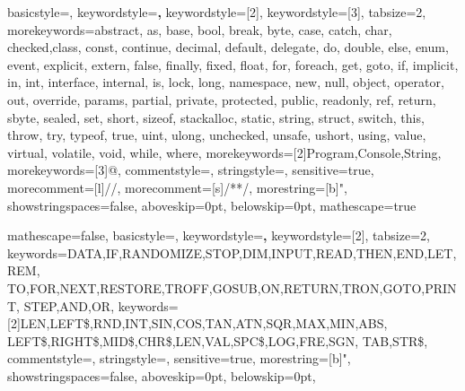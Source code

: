\usepackage{ulem}			%
\usepackage{listings}	%
\usepackage{ifthen}		%
\usepackage{graphicx}

\usepackage[spanish]{babel} %
\usepackage[latin1]{inputenc}



\newcommand{\CommentColor}{\color{green!60!black}}

\newcommand{\StringColor}{\color{red!70!black}}

\newcommand{\UserKeywordsColor}{\color{cyan!50!black}}

\newcommand{\KeywordsColor}{\color{blue}}

{
	basicstyle=\small\ttfamily,
	keywordstyle=\KeywordsColor\textbf,
	keywordstyle=[2]\UserKeywordsColor,
	keywordstyle=[3]\StringColor,
	tabsize=2,
	morekeywords={abstract, as, base, bool, break, byte, case, 
		catch, char, checked,class, const, continue, decimal, 
		default, delegate, do, double, else, enum, event, explicit,
		extern, false, finally, fixed, float, for, foreach, get, goto, 
		if, implicit, in, int, interface, internal, is, lock, long,
		namespace, new, null, object, operator, out, override, 
		params, partial, private, protected, public, readonly, ref, return, 
		sbyte, sealed, set, short, sizeof, stackalloc, static, string,
		struct, switch, this, throw, try, typeof, true, uint, ulong, 
		unchecked, unsafe, ushort, using, value, virtual, volatile,
		void, while, where},
	morekeywords=[2]{Program,Console,String},
	morekeywords=[3]{@}, 
	commentstyle=\CommentColor,
	stringstyle=\StringColor,
	sensitive=true,
	morecomment=[l]{//},
	morecomment=[s]{/*}{*/},
	morestring=[b]",
	showstringspaces=false,
	aboveskip=0pt, 
	belowskip=0pt,
	mathescape=true
}

{
	mathescape=false,
	basicstyle=\small\ttfamily,
	keywordstyle=\KeywordsColor\textbf,
	keywordstyle=[2]\UserKeywordsColor,
	tabsize=2,
	keywords={DATA,IF,RANDOMIZE,STOP,DIM,INPUT,READ,THEN,END,LET,REM,
		TO,FOR,NEXT,RESTORE,TROFF,GOSUB,ON,RETURN,TRON,GOTO,PRINT,
		STEP,AND,OR},
	keywords=[2]{LEN,LEFT\$,RND,INT,SIN,COS,TAN,ATN,SQR,MAX,MIN,ABS,
		LEFT\$,RIGHT\$,MID\$,CHR\$,LEN,VAL,SPC\$,LOG,FRE,SGN,
		TAB,STR\$},
	commentstyle=\CommentColor,
	stringstyle=\StringColor,
	sensitive=true,
	morestring=[b]",
	showstringspaces=false,
	aboveskip=0pt, 
	belowskip=0pt,	
}

